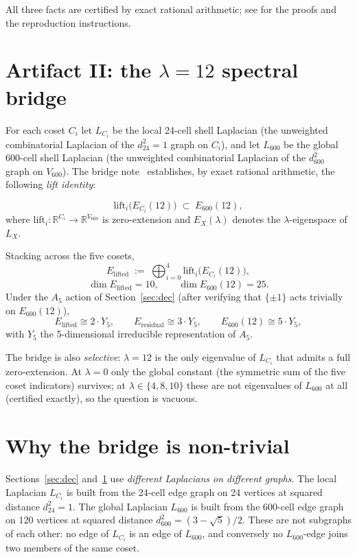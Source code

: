 \documentclass[11pt]{article}
\newcommand{\Vsix}{V_{600}}
\newcommand{\Lsix}{L_{600}}
\newcommand{\Esix}{E_{600}}
\newcommand{\Elift}{E_{\mathrm{lifted}}}
\newcommand{\Eres}{E_{\mathrm{residual}}}
\theoremstyle{definition}
\begin{document}
All three facts are certified by exact rational arithmetic; see
\cite{SmartSchlafli2026} for the proofs and the reproduction
instructions.

\section{Artifact II: the $\lambda=12$ spectral bridge}\label{sec:bridge}

For each coset $C_i$ let $L_{C_i}$ be the local 24-cell shell
Laplacian (the unweighted combinatorial Laplacian of the
$d^2_{24}=1$ graph on $C_i$), and let $\Lsix$ be the global
600-cell shell Laplacian (the unweighted combinatorial Laplacian of
the $d^2_{600}$ graph on $\Vsix$).  The bridge
note~\cite{SmartBridge2026} establishes, by exact rational
arithmetic, the following \emph{lift identity}:

\begin{equation*}
  \mathrm{lift}_i\bigl(E_{C_i}(12)\bigr) \;\subset\; \Esix(12),
\end{equation*}
where $\mathrm{lift}_i\colon\mathbb{R}^{C_i}\to\mathbb{R}^{\Vsix}$
is zero-extension and $E_X(\lambda)$ denotes the
$\lambda$-eigenspace of $L_X$.

Stacking across the five cosets,
\[
  \Elift \;:=\; \bigoplus_{i=0}^{4}
  \mathrm{lift}_i\bigl(E_{C_i}(12)\bigr),
\]
\[
  \dim\Elift = 10, \qquad \dim\Esix(12) = 25.
\]
Under the $A_5$ action of Section~\ref{sec:dec} (after verifying
that $\{\pm 1\}$ acts trivially on $\Esix(12)$),
\[
  \Elift \cong 2\!\cdot\!Y_5, \qquad
  \Eres \cong 3\!\cdot\!Y_5, \qquad
  \Esix(12) \cong 5\!\cdot\!Y_5,
\]
with $Y_5$ the 5-dimensional irreducible representation of $A_5$.

The bridge is also \emph{selective}: $\lambda = 12$ is the only
eigenvalue of $L_{C_i}$ that admits a full zero-extension.  At
$\lambda = 0$ only the global constant (the symmetric sum of the
five coset indicators) survives; at $\lambda \in \{4, 8, 10\}$
these are not eigenvalues of $\Lsix$ at all (certified exactly),
so the question is vacuous.

\section{Why the bridge is non-trivial}\label{sec:nontrivial}

Sections~\ref{sec:dec} and~\ref{sec:bridge} use \emph{different
Laplacians on different graphs}.  The local Laplacian $L_{C_i}$ is
built from the 24-cell edge graph on 24 vertices at squared
distance $d^2_{24}=1$.  The global Laplacian $\Lsix$ is built from
the 600-cell edge graph on 120 vertices at squared distance
$d^2_{600}=(3-\sqrt 5)/2$.  These are not subgraphs of each other:
no edge of $L_{C_i}$ is an edge of $\Lsix$, and conversely no
$\Lsix$-edge joins two members of the same coset.
\end{document}
